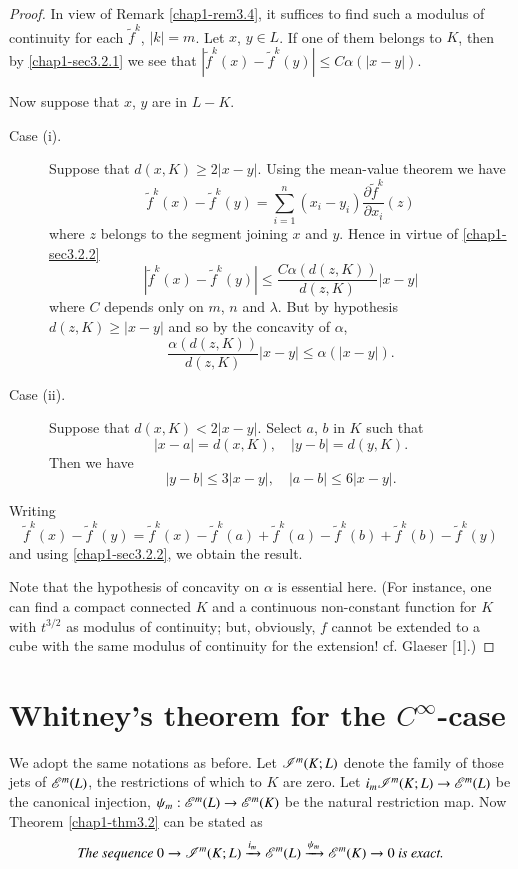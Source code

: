\begin{proof}
In view of Remark \ref{chap1-rem3.4}, it suffices to find such a modulus of continuity for each $\widetilde{f}^{k}$, $|k|=m$. Let $x$, $y\in L$. If one of them belongs to $K$, then by \eqref{chap1-sec3.2.1} we see that $|\widetilde{f}^{k}(x)-\widetilde{f}^{k}(y)|\leq C\alpha (|x-y|)$.

Now suppose that $x$, $y$ are in $L-K$.
\begin{description}
\item[Case (i).] Suppose that $d(x,K)\geq 2|x-y|$. Using the mean-value theorem we have
$$
\widetilde{f}^{k}(x)-\widetilde{f}^{k}(y)=\sum\limits^{n}_{i=1}(x_{i}-y_{i})\dfrac{\partial \widetilde{f}^{k}}{\partial x_{i}}(z)
$$
where $z$ belongs to the segment joining $x$ and $y$. Hence in virtue of \eqref{chap1-sec3.2.2}
$$
|\widetilde{f}^{k}(x)-\widetilde{f}^{k}(y)|\leq \dfrac{C\alpha(d(z,K))}{d(z,K)}|x-y|
$$
where $C$ depends only on $m$, $n$ and $\lambda$. But by hypothesis $d(z,K)\geq |x-y|$ and so by the concavity of $\alpha$,
$$
\dfrac{\alpha(d(z,K))}{d(z,K)}|x-y|\leq \alpha(|x-y|).
$$

\item[Case (ii).] Suppose that $d(x,K)<2|x-y|$. Select $a$, $b$ in $K$ such that
$$
|x-a|=d(x,K),\quad |y-b|=d(y,K).
$$
Then we have
$$
|y-b|\leq 3|x-y|,\quad |a-b|\leq 6|x-y|.
$$
\end{description}

Writing
$$
\widetilde{f}^{k}(x)-\widetilde{f}^{k}(y)=\widetilde{f}^{k}(x)-\widetilde{f}^{k}(a)+\widetilde{f}^{k}(a)-\widetilde{f}^{k}(b)+\widetilde{f}^{k}(b)-\widetilde{f}^{k}(y)
$$
and using \eqref{chap1-sec3.2.2}, we obtain the result.

Note that the hypothesis of concavity on $\alpha$ is essential here. (For instance, one can find a compact connected $K$ and a continuous non-constant function for $K$ with $t^{3/2}$ as modulus of continuity; but, obviously, $f$ cannot be extended to a cube with the same modulus of continuity for the extension! cf. Glaeser [1].)
\end{proof}

\section{Whitney's theorem for the \boldmath$C^{\infty}$-case}\label{chap1-sec4}

We adopt the same notations as before. Let $\mathscr{I}^{m}(K;L)$ denote the family of those jets of $\mathscr{E}^{m}(L)$, the restrictions of which to $K$ are zero. Let $i_{m}\mathscr{I}^{m}(K;L)\to \mathscr{E}^{m}(L)$ be the canonical injection, $\psi_{m}:\mathscr{E}^{m}(L)\to \mathscr{E}^{m}(K)$ be the natural restriction map. Now Theorem \ref{chap1-thm3.2} can be stated as
$$
\text{\em The sequence } 0\to \mathscr{I}^{m}(K;L)\xrightarrow{i_{m}}\mathscr{E}^{m}(L)\xrightarrow{\psi_{m}}\mathscr{E}^{m}(K)\to 0\text{\em \ is exact.}
$$

